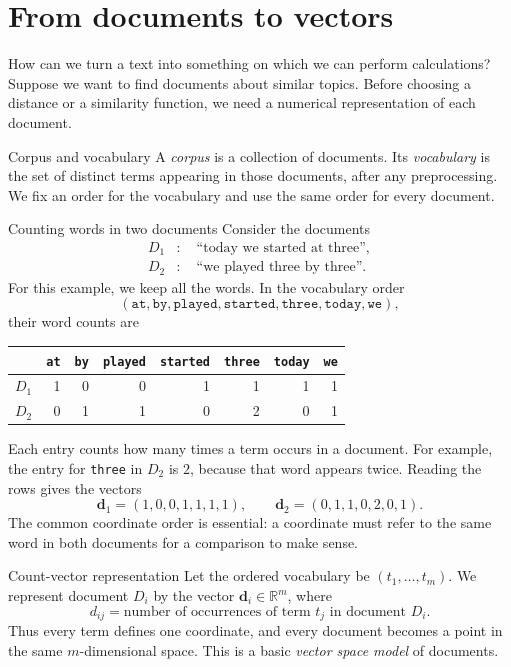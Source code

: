 \documentclass[a4paper,12pt,oneside]{report}
\begin{document}
\section{From documents to vectors}

How can we turn a text into something on which we can perform
calculations? Suppose we want to find documents about similar topics.
Before choosing a distance or a similarity function, we need a numerical
representation of each document.

\begin{frameddefn}{Corpus and vocabulary}\label{def:corpus-vocabulary}
A \emph{corpus} is a collection of documents. Its \emph{vocabulary} is
the set of distinct terms appearing in those documents, after any
preprocessing. We fix an order for the vocabulary and use the same order
for every document.
\end{frameddefn}

\begin{framedexample}{Counting words in two documents}\label{ex:document-counts}
Consider the documents
\begin{align*}
  D_1&:\quad\text{``today we started at three''},\\
  D_2&:\quad\text{``we played three by three''}.
\end{align*}
For this example, we keep all the words. In the vocabulary order
\[
  (\texttt{at},\texttt{by},\texttt{played},\texttt{started},
    \texttt{three},\texttt{today},\texttt{we}),
\]
their word counts are
\begin{center}
\begin{tabular}{c|rrrrrrr}
  & \texttt{at} & \texttt{by} & \texttt{played} & \texttt{started}
  & \texttt{three} & \texttt{today} & \texttt{we}\\\hline
  $D_1$ & 1 & 0 & 0 & 1 & 1 & 1 & 1\\
  $D_2$ & 0 & 1 & 1 & 0 & 2 & 0 & 1
\end{tabular}
\end{center}
Each entry counts how many times a term occurs in a document. For
example, the entry for \texttt{three} in $D_2$ is $2$, because that word
appears twice. Reading the rows gives the vectors
\[
  \mathbf d_1=(1,0,0,1,1,1,1),\qquad
  \mathbf d_2=(0,1,1,0,2,0,1).
\]
The common coordinate order is essential: a coordinate must refer to
the same word in both documents for a comparison to make sense.
\end{framedexample}

\begin{frameddefn}{Count-vector representation}\label{def:document-vector}
Let the ordered vocabulary be $(t_1,\ldots,t_m)$. We represent document
$D_i$ by the vector $\mathbf d_i\in\mathbb R^m$, where
\[
  d_{ij}=\text{number of occurrences of term $t_j$ in document $D_i$}.
\]
Thus every term defines one coordinate, and every document becomes a
point in the same $m$-dimensional space. This is a basic
\emph{vector space model} of documents.
\end{frameddefn}
\end{document}

